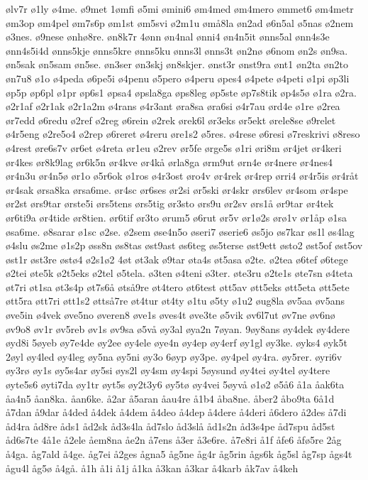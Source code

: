 {ølv7r
ø1ly
ø4me.
ø9met
1ømfi
ø5mi
ømini6
øm4med
øm4mero
ømmet6
øm4metr
øm3op
øm4pel
øm7s6p
øm1st
øm5svi
ø2m1u
ømå8la
øn2ad
ø6n5al
ø5nas
ø2nem
ø3nes.
ø9nese
ønhø8re.
øn8k7r
4ønn
øn4nal
ønni4
øn4n5it
ønns5al
ønn4s3e
ønn4s5i4d
ønns5kje
ønns5kre
ønns5ku
ønns3l
ønns3t
øn2nø
ø6nom
øn2s
øn9sa.
øn5sak
øn5sam
øn5se.
øn3ser
øn3skj
øn8skjer.
ønst3r
ønst9ra
ønt1
øn2ta
øn2to
øn7u8
ø1o
ø4peda
ø6pe5i
ø4penu
ø5pero
ø4peru
øpes4
ø4pete
ø4peti
ø1pi
øp3li
øp5p
øp6pl
ø1pr
øp6s1
øpsa4
øpsla8ga
øps8leg
øp5ste
øp7s8tik
øp4s5ø
ø1ra
ø2ra.
ø2r1af
ø2r1ak
ø2r1a2m
ø4rans
ø4r3ant
øra8sa
øra6si
ø4r7au
ørd4e
ø1re
ø2rea
ør7edd
ø6redu
ø2ref
ø2reg
ø6rein
ø2rek
ørek6l
ør3eks
ør5ekt
ørele8se
ø9relet
ø4r5eng
ø2re5o4
ø2rep
ø6reret
ø4reru
øre1s2
ø5res.
ø4rese
ø6resi
ø7reskrivi
ø8reso
ø4rest
øre6s7v
ør6et
ø4reta
ør1eu
ø2rev
ør5fe
ørge5s
ø1ri
øri8m
ør4jet
ør4keri
ør4kes
ør8k9lag
ør6k5n
ør4kve
ør4kå
ørla8ga
ørm9ut
ørn4e
ør4nere
ør4nes4
ør4n3u
ør4n5ø
ør1o
ø5r6ok
ø1ros
ø4r3ost
øro4v
ør4rek
ør4rep
ørri4
ør4r5is
ør4råt
ør4sak
ørsa8ka
ørsa6me.
ør4sc
ør6ses
ør2si
ør5ski
ør4skr
ørs6lev
ør4som
ør4spe
ør2st
ørs9tar
ørste5i
ørs5tens
ørs5tig
ør3sto
ørs9u
ør2sv
ørs1å
ør9tar
ør4tek
ør6ti9a
ør4tide
ør8tien.
ør6tif
ør3to
ørum5
ø6rut
ør5v
ør1ø2s
ørø1v
ør1åp
ø1sa
øsa6me.
ø8sarar
ø1sc
ø2se.
ø2sem
øse4n5o
øseri7
øserie6
øs5jo
øs7kar
øs1l
øs4lag
ø4slu
øs2me
ø1s2p
øss8n
øs8tas
øst9ast
øs6teg
øs5terse
øst9ett
østo2
øst5of
øst5ov
øst1r
øst3re
østø4
ø2s1ø2
4øt
øt3ak
ø9tar
øta4s
øt5asa
ø2te.
ø2tea
ø6tef
ø6tege
ø2tei
øte5k
ø2t5eks
ø2tel
ø5tela.
ø3ten
ø4teni
ø3ter.
øte3ru
ø2te1s
øte7sn
ø4teta
øt7ri
øt1sa
øt3s4p
øt7s6å
øtså9re
øt4tero
øt6test
øtt5av
øtt5eks
øtt5eta
øtt5ete
øtt5ra
øtt7ri
øtt1s2
øttså7re
øt4tur
øt4ty
ø1tu
ø5ty
ø1u2
øug8la
øv5aa
øv5ans
øve5in
ø4vek
øve5no
øveren8
øve1s
øves4t
øve3te
ø5vik
øv6l7ut
øv7ne
øv6nø
øv9o8
øv1r
øv5reb
øv1s
øv9sa
ø5vå
øy3al
øya2n
7øyan.
9øy8ans
øy4dek
øy4dere
øyd8i
5øyeb
øy7e4de
øy2ee
øy4ele
øye4n
øy4ep
øy4erf
øy1gl
øy3ke.
øyks4
øyk5t
2øyl
øy4led
øy4leg
øy5na
øy5ni
øy3o
6øyp
øy3pe.
øy4pel
øy4ra.
øy5rer.
øyri6v
øy3rø
øy1s
øy5s4ar
øy5si
øys2l
øy4sm
øy4spi
5øysund
øy4tei
øy4tel
øy4tere
øyte5s6
øyti7da
øy1tr
øyt5s
øy2t3y6
øy5tø
øy4vei
5øyvå
ø1ø2
ø5å6
å1a
åak6ta
åa4n5
åan8ka.
åan6ke.
å2ar
å5aran
åau4re
å1b4
åba8ne.
åber2
åbo9ta
6å1d
å7dan
å9dar
å4ded
å4dek
å4dem
å4deo
å4dep
å4dere
å4deri
å6dero
å2des
å7di
åd4ra
åd8re
åds1
åd2sk
åd3s4la
åd7slo
åd3slå
åd1s2n
åd3s4pe
åd7spu
åd5st
åd6s7te
4å1e
å2ele
åem8na
åe2n
å7ens
å3er
å3e6re.
å7e8ri
å1f
åfe6
åfø5re
2åg
å4ga.
åg7ald
å4ge.
åg7ei
å2ges
ågna5
åg5ne
åg4r
åg5rin
ågs6k
åg5sl
åg7sp
ågs4t
ågu4l
åg5ø
å4gå.
å1h
å1i
å1j
å1ka
å3kan
å3kar
å4karb
åk7av
å4keh
}
